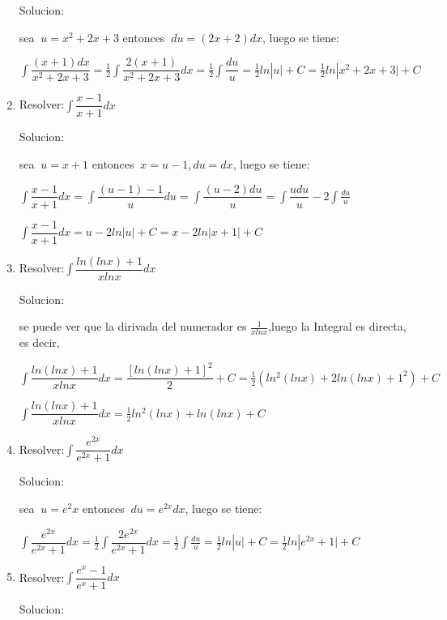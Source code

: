 \documentclass[10pt,a4paper]{book}
\newcommand{\ds}{\displaystyle}
\begin{document}
\begin{enumerate}
        Solucion:

        sea $\ds\ u=x^2+2x+3$ entonces $\ds\ du=(2x+2)dx$, luego se tiene:

        $\ds\int\dfrac{(x+1)dx}{x^2+2x+3}=\frac{1}{2}\int\dfrac{2(x+1)}{x^2+2x+3}dx=\frac{1}{2}\int\dfrac{du}{u}
        =\frac{1}{2}ln|u \vert+C=\frac{1}{2}ln|x^2+2x+3 \vert+C$

    \vspace{0.5cm}
    \item Resolver:$\ds\int\dfrac{x-1}{x+1}dx$
    
        Solucion:

        sea $\ds\ u=x+1$ entonces $\ds\ x=u-1,du=dx$, luego se tiene:

        $\ds\int\dfrac{x-1}{x+1}dx=\int \dfrac{(u-1)-1}{u}du=\int\dfrac{(u-2)du}{u}=\int\dfrac{udu}{u}-2\int\frac{du}{u}$

        $\ds\int\dfrac{x-1}{x+1}dx=u-2ln|u \vert+C=x-2ln|x+1 \vert+C $

    \vspace{0.5cm}
    \item Resolver:$\ds\int\dfrac{ln(lnx)+1}{xlnx}dx$
    
        Solucion:

        se puede ver que la dirivada del numerador es $\ds\frac{1}{xlnx}$,luego la Integral es directa, es decir,

        $\ds\int\dfrac{ln(lnx)+1}{xlnx}dx=\dfrac{\left[ln(lnx)+1\right]^2}{2}+C=\frac{1}{2}(ln^2(lnx)+2ln(lnx)+1^2)+C$

        $\ds\int\dfrac{ln(lnx)+1}{xlnx}dx=\frac{1}{2}ln^2(lnx)+ln(lnx)+C$

    \vspace{0.5cm}
    \item Resolver:$\ds\int\dfrac{e^{2x}}{e^{2x}+1}dx$
    
        Solucion:

        sea $\ds\ u=e^2x$ entonces $\ds\ du=e^{2x}dx$, luego se tiene:

        $\ds\int\dfrac{e^{2x}}{e^{2x}+1}dx=\frac{1}{2}\int\dfrac{2e^{2x}}{e^{2x}+1}dx=\frac{1}{2}\int\frac{du}{u}=
        \frac{1}{2}ln|u \vert+C=\frac{1}{2}ln|e^{2x}+1 \vert+C $


    \vspace{0.5cm}
    \item Resolver:$\ds\int \dfrac{e^x-1}{e^x+1}dx$
    
        Solucion:

    






\end{enumerate}
\end{document}
